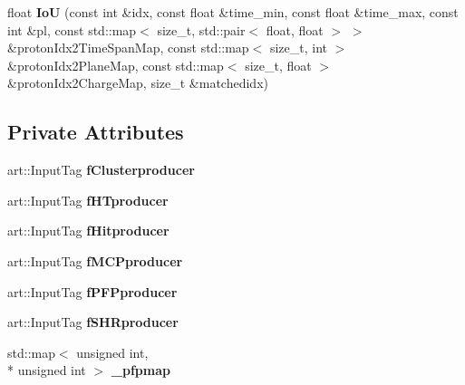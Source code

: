\begin{DoxyCompactItemize}
\item 
\hypertarget{classProtonHitPurity_a947d6c3c40631fdfb260eee9aea4f439}{float {\bfseries Io\-U} (const int \&idx, const float \&time\-\_\-min, const float \&time\-\_\-max, const int \&pl, const std\-::map$<$ size\-\_\-t, std\-::pair$<$ float, float $>$ $>$ \&proton\-Idx2\-Time\-Span\-Map, const std\-::map$<$ size\-\_\-t, int $>$ \&proton\-Idx2\-Plane\-Map, const std\-::map$<$ size\-\_\-t, float $>$ \&proton\-Idx2\-Charge\-Map, size\-\_\-t \&matchedidx)}\label{classProtonHitPurity_a947d6c3c40631fdfb260eee9aea4f439}

\end{DoxyCompactItemize}
\subsection*{Private Attributes}
\begin{DoxyCompactItemize}
\item 
\hypertarget{classProtonHitPurity_a9cde3bb38128414175bdec828c258628}{art\-::\-Input\-Tag {\bfseries f\-Clusterproducer}}\label{classProtonHitPurity_a9cde3bb38128414175bdec828c258628}

\item 
\hypertarget{classProtonHitPurity_a67a39931d4884a9b8551d5158f37c954}{art\-::\-Input\-Tag {\bfseries f\-H\-Tproducer}}\label{classProtonHitPurity_a67a39931d4884a9b8551d5158f37c954}

\item 
\hypertarget{classProtonHitPurity_a7285b631733a327b17852217edcf130c}{art\-::\-Input\-Tag {\bfseries f\-Hitproducer}}\label{classProtonHitPurity_a7285b631733a327b17852217edcf130c}

\item 
\hypertarget{classProtonHitPurity_a582ca83452036a5a15bde53595858dab}{art\-::\-Input\-Tag {\bfseries f\-M\-C\-Pproducer}}\label{classProtonHitPurity_a582ca83452036a5a15bde53595858dab}

\item 
\hypertarget{classProtonHitPurity_a58af404af2943b95545b5435f984b34c}{art\-::\-Input\-Tag {\bfseries f\-P\-F\-Pproducer}}\label{classProtonHitPurity_a58af404af2943b95545b5435f984b34c}

\item 
\hypertarget{classProtonHitPurity_ae02e24d9473737eba23b266383f240b0}{art\-::\-Input\-Tag {\bfseries f\-S\-H\-Rproducer}}\label{classProtonHitPurity_ae02e24d9473737eba23b266383f240b0}

\item 
\hypertarget{classProtonHitPurity_abaa0fd0f88cca733f6e1f58248d22e9b}{std\-::map$<$ unsigned int, \\*
unsigned int $>$ {\bfseries \-\_\-pfpmap}}\label{classProtonHitPurity_abaa0fd0f88cca733f6e1f58248d22e9b}


\end{DoxyCompactItemize}

